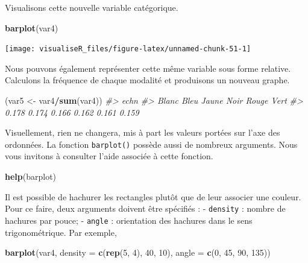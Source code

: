 \documentclass[]{article}
\newenvironment{Shaded}{\begin{snugshade}}{\end{snugshade}}
\newcommand{\CommentTok}[1]{\textcolor[rgb]{0.56,0.35,0.01}{\textit{#1}}}
\newcommand{\DataTypeTok}[1]{\textcolor[rgb]{0.13,0.29,0.53}{#1}}
\newcommand{\DecValTok}[1]{\textcolor[rgb]{0.00,0.00,0.81}{#1}}
\newcommand{\KeywordTok}[1]{\textcolor[rgb]{0.13,0.29,0.53}{\textbf{#1}}}
\newcommand{\NormalTok}[1]{#1}
\newcommand{\OperatorTok}[1]{\textcolor[rgb]{0.81,0.36,0.00}{\textbf{#1}}}
\newcommand{\StringTok}[1]{\textcolor[rgb]{0.31,0.60,0.02}{#1}}
\begin{document}
Visualisons cette nouvelle variable catégorique.

\begin{Shaded}
\begin{Highlighting}[]
\KeywordTok{barplot}\NormalTok{(var4)}
\end{Highlighting}
\end{Shaded}

\begin{center}\texttt{[image: visualiseR\_files/figure-latex/unnamed-chunk-51-1]} \end{center}

Nous pouvons également représenter cette même variable sous forme relative. Calculons la fréquence de chaque modalité et produisons un nouveau graphe.

\begin{Shaded}
\begin{Highlighting}[]
\NormalTok{(var5 <-}\StringTok{ }\NormalTok{var4}\OperatorTok{/}\KeywordTok{sum}\NormalTok{(var4))}
\CommentTok{#> echn}
\CommentTok{#> Blanc  Bleu Jaune  Noir Rouge  Vert }
\CommentTok{#> 0.178 0.174 0.166 0.162 0.161 0.159}
\end{Highlighting}
\end{Shaded}

Visuellement, rien ne changera, mis à part les valeurs portées sur l'axe des ordonnées. La fonction \texttt{barplot()} possède aussi de nombreux arguments. Nous vous invitons à consulter l'aide associée à cette fonction.

\begin{Shaded}
\begin{Highlighting}[]
\KeywordTok{help}\NormalTok{(barplot)}
\end{Highlighting}
\end{Shaded}

Il est possible de hachurer les rectangles plutôt que de leur associer une couleur. Pour ce faire, deux arguments doivent être spécifiés :
- \texttt{density} : nombre de hachures par pouce;
- \texttt{angle} : orientation des hachures dans le sens trigonométrique.
Par exemple,

\begin{Shaded}
\begin{Highlighting}[]
\KeywordTok{barplot}\NormalTok{(var4, }\DataTypeTok{density =} \KeywordTok{c}\NormalTok{(}\KeywordTok{rep}\NormalTok{(}\DecValTok{5}\NormalTok{, }\DecValTok{4}\NormalTok{), }\DecValTok{40}\NormalTok{, }\DecValTok{10}\NormalTok{), }\DataTypeTok{angle =} \KeywordTok{c}\NormalTok{(}\DecValTok{0}\NormalTok{, }\DecValTok{45}\NormalTok{, }\DecValTok{90}\NormalTok{, }\DecValTok{135}\NormalTok{))}
\end{Highlighting}
\end{Shaded}
\end{document}
